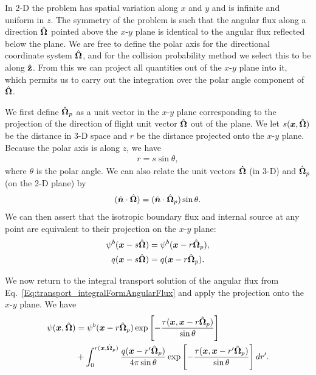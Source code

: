 In 2-D the problem has spatial variation along $x$ and $y$ and is infinite and uniform in $z$. The symmetry of the problem is such that the angular flux along a direction $\hat{\mathbf{\Omega}}$ pointed above the $x$-$y$ plane is identical to the angular flux reflected below the plane. We are free to define the polar axis for the directional coordinate system $\hat{\mathbf{\Omega}}$, and for the collision probability method we select this to be along $\hat{\mathbf{z}}$. From this we can project all quantities out of the $x$-$y$ plane into it, which permits us to carry out the integration over the polar angle component of $\hat{\mathbf{\Omega}}$.

We first define $\hat{\mathbf{\Omega}}_p$ as a unit vector in the $x$-$y$ plane corresponding to the projection of the direction of flight unit vector $\hat{\mathbf{\Omega}}$ out of the plane. We let $s(\bm{x},\hat{\mathbf{\Omega}})$ be the distance in 3-D space and $r$ be the distance projected onto the $x$-$y$ plane. Because the polar axis is along $z$, we have
\begin{align}
  r = s \sin\theta,
\end{align}
where $\theta$ is the polar angle. We can also relate the unit vectors $\hat{\mathbf{\Omega}}$ (in 3-D) and $\hat{\mathbf{\Omega}}_p$ (on the 2-D plane) by
\begin{align}
  ( \hat{\bm{n}} \cdot \hat{\mathbf{\Omega}} ) = ( \hat{\bm{n}} \cdot \hat{\mathbf{\Omega}}_p ) \sin\theta .
\end{align}
We can then assert that the isotropic boundary flux and internal source at any point are equivalent to their projection on the $x$-$y$ plane:
\begin{subequations}
\begin{align}
  \psi^b( \bm{x} - s \hat{\mathbf{\Omega}} ) &= \psi^b( \bm{x} - r \hat{\mathbf{\Omega}}_p ) , \\*
  q( \bm{x} - s \hat{\mathbf{\Omega}} ) &= q( \bm{x} - r \hat{\mathbf{\Omega}}_p ) .
\end{align}
\end{subequations}

We now return to the integral transport solution of the angular flux from Eq.~\eqref{Eq:transport_integralFormAngularFlux} and apply the projection onto the $x$-$y$ plane. We have
\begin{align}
  \psi(\bm{x},\hat{\mathbf{\Omega}}) 
  &= \psi^b( \bm{x} - r \hat{\mathbf{\Omega}}_p ) \exp\left[ -\frac{\tau(\bm{x},\bm{x} - r \hat{\mathbf{\Omega}}_p)}{\sin\theta} \right] \nonumber \\
  &+ \int_0^{r(\bm{x},\hat{\mathbf{\Omega}}_p)} \frac{q( \bm{x} - r' \hat{\mathbf{\Omega}}_p )}{4\pi \sin\theta } \exp\left[ -\frac{\tau(\bm{x},\bm{x} - r' \hat{\mathbf{\Omega}}_p)}{\sin\theta} \right] dr'.
\end{align}

